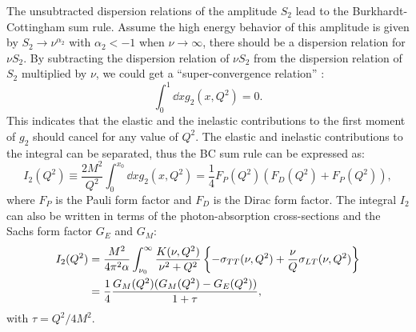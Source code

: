The unsubtracted dispersion relations of the amplitude $S_2$ lead to the Burkhardt-Cottingham sum rule. Assume the high energy behavior of this amplitude is given by $S_2\rightarrow\nu^{\alpha_2}$ with $\alpha_2<-1$ when $\nu\rightarrow\infty$, there should be a dispersion relation for $\nu S_2$. By subtracting the dispersion relation of $\nu S_2$ from the dispersion relation of $S_2$ multiplied by $\nu$, we could get a ``super-convergence relation'' \cite{Burkhardt1970}:
\begin{equation} \label{C2S4SS3E20}
\int_0^1\dd{x}g_2(x,Q^2) = 0.
\end{equation}
This indicates that the elastic and the inelastic contributions to the first moment of $g_2$ should cancel for any value of $Q^2$. The elastic and inelastic contributions to the integral can be separated, thus the BC sum rule can be expressed as:
\begin{equation} \label{C2S4SS3E21}
I_2(Q^2) \equiv \frac{2M^2}{Q^2}\int_0^{x_0}\dd{x}g_2(x,Q^2) = \frac{1}{4}F_P(Q^2)(F_D(Q^2)+F_P(Q^2)),
\end{equation}
where $F_P$ is the Pauli form factor and $F_D$ is the Dirac form factor. The integral $I_2$ can also be written in terms of the photon-absorption cross-sections and the Sachs form factor $G_E$ and $G_M$:
\begin{equation} \label{C2S4SS3E22}
\begin{split}
I_2(Q^2) & = \frac{M^2}{4\pi^2\alpha}\int_{\nu_0}^\infty\frac{K(\nu,Q^2)}{\nu^2+Q^2}\left\{-\sigma_{TT}(\nu,Q^2)+\frac{\nu}{Q}\sigma_{LT}(\nu,Q^2)\right\} \\
& = \frac{1}{4}\frac{G_M(Q^2)(G_M(Q^2)-G_E(Q^2))}{1+\tau},
\end{split}
\end{equation}
with $\tau=Q^2/4M^2$.

